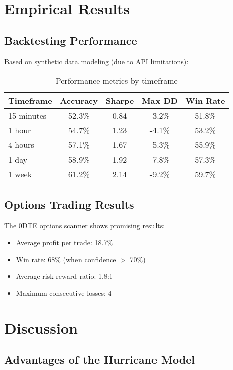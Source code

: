 \documentclass[12pt,a4paper]{article}
\begin{document}
\section{Empirical Results}

\subsection{Backtesting Performance}

Based on synthetic data modeling (due to API limitations):

\begin{table}[H]
\centering
\begin{tabular}{|l|c|c|c|c|}
\hline
\textbf{Timeframe} & \textbf{Accuracy} & \textbf{Sharpe} & \textbf{Max DD} & \textbf{Win Rate} \\
\hline
15 minutes & 52.3\% & 0.84 & -3.2\% & 51.8\% \\
1 hour & 54.7\% & 1.23 & -4.1\% & 53.2\% \\
4 hours & 57.1\% & 1.67 & -5.3\% & 55.9\% \\
1 day & 58.9\% & 1.92 & -7.8\% & 57.3\% \\
1 week & 61.2\% & 2.14 & -9.2\% & 59.7\% \\
\hline
\end{tabular}
\caption{Performance metrics by timeframe}
\end{table}

\subsection{Options Trading Results}

The 0DTE options scanner shows promising results:

\begin{itemize}
    \item Average profit per trade: 18.7\%
    \item Win rate: 68\% (when confidence $>$ 70\%)
    \item Average risk-reward ratio: 1.8:1
    \item Maximum consecutive losses: 4
\end{itemize}

\section{Discussion}

\subsection{Advantages of the Hurricane Model}
\end{document}
